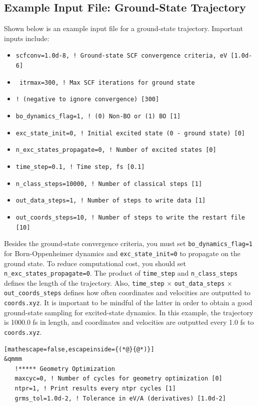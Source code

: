 \documentclass[letterpaper,12pt,titlepage]{article}
\begin{document}
\begin{appendix}
\subsection{Example Input File: Ground-State Trajectory}
\label{input_gstraj}
Shown below is an example input file for a ground-state trajectory.  Important inputs include:
\begin{itemize}
\item \verb+scfconv=1.0d-8, ! Ground-state SCF convergence criteria, eV [1.0d-6]+
\item \verb+ itrmax=300, ! Max SCF iterations for ground state+ 
\item[] \verb+! (negative to ignore convergence) [300]+
\item \verb+bo_dynamics_flag=1, ! (0) Non-BO or (1) BO [1]+
\item \verb+exc_state_init=0, ! Initial excited state (0 - ground state) [0]+
\item \verb+n_exc_states_propagate=0, ! Number of excited states [0]+
\item \verb+time_step=0.1, ! Time step, fs [0.1]+
\item \verb+n_class_steps=10000, ! Number of classical steps [1]+
\item \verb+out_data_steps=1, ! Number of steps to write data [1]+
\item \verb+out_coords_steps=10, ! Number of steps to write the restart file [10]+
\end{itemize}
Besides the ground-state convergence criteria, you must set \verb+bo_dynamics_flag=1+ for Born-Oppenheimer dynamics and \verb+exc_state_init=0+ to propagate on the ground state.  To reduce computational cost, you should set \verb+n_exc_states_propagate=0+.  The product of \verb+time_step+ and \verb+n_class_steps+ defines the length of the trajectory.  Also, \verb+time_step+ $\times$ \verb+out_data_steps+ $\times$ \verb+out_coords_steps+ defines how often coordinates and velocities are outputted to \verb+coords.xyz+.  It is important to be mindful of the latter in order to obtain a good ground-state sampling for excited-state dynamics.  In this example, the trajectory is 1000.0 fs in length, and coordinates and velocities are outputted every 1.0 fs to \verb+coords.xyz+.
\begin{lstlisting}[mathescape=false,escapeinside={(*@}{@*)}]
&qmmm
   !***** Geometry Optimization
   maxcyc=0, ! Number of cycles for geometry optimization [0]
   ntpr=1, ! Print results every ntpr cycles [1]
   grms_tol=1.0d-2, ! Tolerance in eV/A (derivatives) [1.0d-2]


\end{lstlisting}
\end{appendix}
\end{document}
